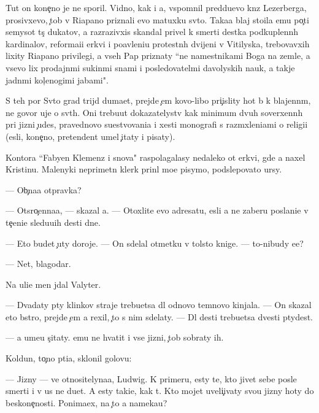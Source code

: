 \documentclass[10pt]{book}
\begin{document}
Tut on kone{\c}no je ne sporil. Vidno, kak i {\y}a, vspomnil pred{\yi}du{\x}evo kn{\ia}z{\ia} Lezerberga, prosivxevo, {\c}tob{\yi} v Riapano priznali {\y}evo matuxku sv{\ia}to{\y}. Taka{\y}a blaj sto{\y}ila {\y}emu po{\c}ti semysot t{\yi}s{\ia}{\c} dukatov, a razrazivxi{\y}s{\ia} skandal privel k smerti des{\ia}tka podkuplenn{\yi}h kardinalov, reforma{\q}i{\y}i {\Q}erkvi i po{\y}avleni{\y}u protestn{\yi}h dvijeni{\y} v Vitilyska, trebovavxih lixity Riapano privilegi{\y}, a vseh Pap priznaty ``ne namestnikami Boga na zemle, a vsevo lix prodajn{\yi}mi sukin{\yi}mi s{\yi}nami i posledovatel{\ia}mi d{\y}avolyskih nauk, a takje jadn{\yi}mi kol{\c}enogimi jabami".

S teh por Sv{\ia}to{\y} grad trijd{\yi} duma{\y}et, prejde {\c}em kovo-libo pri{\c}islity hot{\ia} b{\yi} k blajenn{\yi}m, ne govor{\ia} uje o sv{\ia}t{\yi}h. Oni trebu{\y}ut dokazatelystv kak minimum dvuh soverxenn{\yi}h pri jizni {\c}udes, pravednovo su{\x}estvovani{\y}a i xesti monografi{\y} s razm{\yi}xleni{\y}ami o religi{\y}i ({\y}esli, kone{\c}no, pretendent umel {\c}itaty i pisaty).

Kontora ``Fabyen Klemenz i s{\yi}nov{\y}a" raspolagalasy nedaleko ot {\q}erkvi, gde {\y}a naxel Kristinu. Malenyki{\y} neprimetn{\yi}{\y} klerk prin{\ia}l mo{\y}e pisymo, podslepovato {\x}ur{\ia}sy.

— Ob{\yi}{\c}na{\y}a otpravka?

— Otsro{\c}enna{\y}a, — skazal {\y}a. — Otoxlite {\y}evo adresatu, {\y}esli {\y}a ne zaberu poslani{\y}e v te{\c}eni{\y}e sledu{\y}u{\x}ih des{\ia}ti dne{\y}.

— Eto budet {\c}uty doroje. — On sdelal otmetku v tolsto{\y} knige. — {\C}to-nibudy {\y}e{\x}e?

— Net, blagodar{\iu}.

Na uli{\q}e men{\ia} jdal Valyter.

— Dvad{\q}aty p{\ia}ty klinkov straje{\y} trebu{\y}etsa dl{\ia} odnovo temnovo kinjala. — On skazal eto b{\yi}stro, prejde {\c}em {\y}a rexil, {\c}to s nim sdelaty. — Dl{\ia} des{\ia}ti trebu{\y}etsa dvesti p{\ia}tydes{\ia}t.

— {\Y}a ume{\y}u s{\c}itaty. {\Y}emu ne hvatit i vse{\y} jizni, {\c}tob{\yi} sobraty ih.

Koldun, to{\c}no pti{\q}a, sklonil golovu:

— Jizny — ve{\x} otnositelyna{\y}a, Ludwig. K primeru, {\y}esty te, kto jivet sebe posle smerti i v us ne du{\y}et. A {\y}esty taki{\y}e, kak t{\yi}. Kto mojet uveli{\c}ivaty svo{\y}u jizny hoty do beskone{\c}nosti. Ponima{\y}ex, na {\c}to {\y}a nameka{\y}u?
\end{document}
